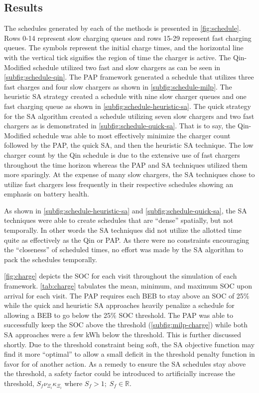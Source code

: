 \documentclass[energies,article,submit,moreauthors]{Definitions/mdpi}
\begin{document}
\subsection{Results}
\label{sec:sa-results}
The schedules generated by each of the methods is presented in \ref{fig:schedule}. Rows 0-14 represent slow charging
queues and rows 15-29 represent fast charging queues. The symbols represent the initial charge times, and the horizontal
line with the vertical tick signifies the region of time the charger is active. The Qin-Modified schedule utilized two
fast and slow chargers as can be seen in \ref{subfig:schedule-qin}. The PAP framework generated a schedule that utilizes
three fast charges and four slow chargers as shown in \ref{subfig:schedule-milp}. The heuristic SA strategy created a
schedule with nine slow charger queues and one fast charging queue as shown in \ref{subfig:schedule-heuristic-sa}. The
quick strategy for the SA algorithm created a schedule utilizing seven slow chargers and two fast chargers as is
demonstrated in \ref{subfig:schedule-quick-sa}. That is to say, the Qin-Modified schedule was able to most effectively
minimize the charger count followed by the PAP, the quick SA, and then the heuristic SA technique. The low charger count
by the Qin schedule is due to the extensive use of fast chargers throughout the time horizon whereas the PAP and SA
techniques utilized them more sparingly. At the expense of many slow chargers, the SA techniques chose to utilize fast
chargers less frequently in their respective schedules showing an emphasis on battery health.

As shown in \ref{subfig:schedule-heuristic-sa} and \ref{subfig:schedule-quick-sa}, the SA techniques were able to create
schedules that are ``dense'' spatially, but not temporally. In other words the SA techniques did not utilize the allotted
time quite as effectively as the Qin or PAP. As there were no constraints encouraging the ``closeness'' of scheduled
times, no effort was made by the SA algorithm to pack the schedules temporally.

\ref{fig:charge} depicts the SOC for each visit throughout the simulation of each framework. \ref{tab:charge} tabulates the
mean, minimum, and maximum SOC upon arrival for each visit. The PAP requires each BEB to stay above an SOC of 25\% while
the quick and heuristic SA approaches heavily penalize a schedule for allowing a BEB to go below the 25\% SOC threshold.
The PAP was able to successfully keep the SOC above the threshold (\ref{subfig:milp-charge}) while both SA approaches
were a few kWh below the threshold. This is further discussed shortly. Due to the threshold constraint being soft, the
SA objective function may find it more ``optimal'' to allow a small deficit in the threshold penalty function in favor for
of another action. As a remedy to ensure the SA schedules stay above the threshold, a safety factor could be introduced
to artificially increase the threshold, \(S_f \nu_{\Xi_i}\kappa_{\Xi_i}\) where \(S_f > 1;\; S_f \in \mathbb{R}\).
\end{document}
